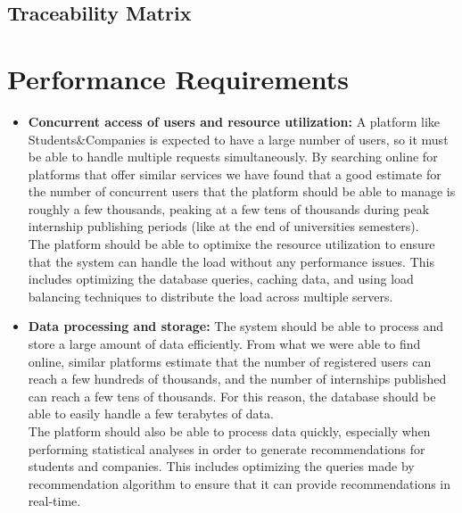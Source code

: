 \subsection{Traceability Matrix}


\section{Performance Requirements}
\begin{itemize}
    \item \textbf{Concurrent access of users and resource utilization:} A platform like Students\&Companies is expected to have a large
    number of users, so it must be able to handle multiple requests simultaneously. By searching online for platforms that offer similar
    services we have found that a good estimate for the number of concurrent users that the platform should be able to manage is roughly
    a few thousands, peaking at a few tens of thousands during peak internship publishing periods (like at the end of universities semesters). \\
    The platform should be able to optimixe the resource utilization to ensure that the system can handle the load without any performance
    issues. This includes optimizing the database queries, caching data, and using load balancing techniques to distribute the load across
    multiple servers.
    
    \item \textbf{Data processing and storage:} The system should be able to process and store a large amount of data efficiently. From 
    what we were able to find online, similar platforms estimate that the number of registered users can reach a few hundreds of thousands,
    and the number of internships published can reach a few tens of thousands. For this reason, the database should be able to easily handle
    a few terabytes of data. \\
    The platform should also be able to process data quickly, especially when performing statistical analyses in order to generate recommendations 
    for students and companies. This includes optimizing the queries made by recommendation algorithm to ensure that it can provide 
    recommendations in real-time.


\end{itemize}
